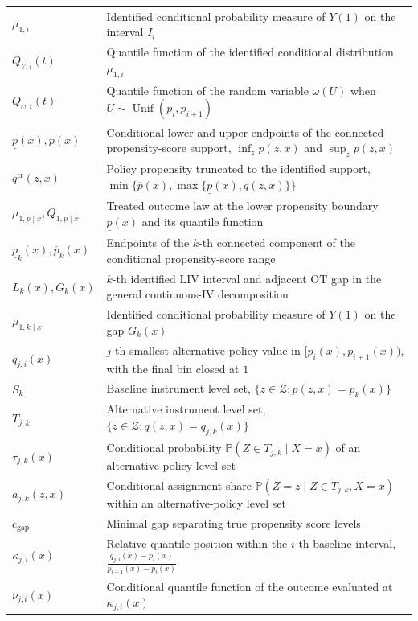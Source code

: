 {\begin{longtable}{lp{\dimexpr\textwidth-5.6cm\relax}}
$\mu_{1,i}$ & Identified conditional probability measure of $Y(1)$ on the interval $I_i$ \\
$Q_{Y,i}(t)$ & Quantile function of the identified conditional distribution $\mu_{1,i}$ \\
$Q_{\omega,i}(t)$ & Quantile function of the random variable $\omega(U)$ when $U \sim \operatorname{Unif}(p_i, p_{i+1})$ \\
$\underline{p}(x), \overline{p}(x)$ & Conditional lower and upper endpoints of the connected propensity-score support, $\inf_z p(z,x)$ and $\sup_z p(z,x)$ \\
$q^{\mathrm{tr}}(z,x)$ & Policy propensity truncated to the identified support, $\min\{\overline{p}(x),\max\{\underline{p}(x),q(z,x)\}\}$ \\
$\mu_{1,\underline{p}\mid x}, Q_{1,\underline{p}\mid x}$ & Treated outcome law at the lower propensity boundary $\underline{p}(x)$ and its quantile function \\
$\underline{p}_k(x), \overline{p}_k(x)$ & Endpoints of the $k$-th connected component of the conditional propensity-score range \\
$L_k(x), G_k(x)$ & $k$-th identified LIV interval and adjacent OT gap in the general continuous-IV decomposition \\
$\mu_{1,k\mid x}$ & Identified conditional probability measure of $Y(1)$ on the gap $G_k(x)$ \\
$q_{j,i}(x)$ & $j$-th smallest alternative-policy value in $[p_i(x),p_{i+1}(x))$, with the final bin closed at $1$ \\
$S_k$ & Baseline instrument level set, $\{z \in \mathcal{Z} : p(z,x) = p_k(x)\}$ \\
$T_{j,k}$ & Alternative instrument level set, $\{z \in \mathcal{Z} : q(z,x) = q_{j,k}(x)\}$ \\
$\tau_{j,k}(x)$ & Conditional probability $\mathbb P(Z\in T_{j,k}\mid X=x)$ of an alternative-policy level set \\
$a_{j,k}(z,x)$ & Conditional assignment share $\mathbb P(Z=z\mid Z\in T_{j,k},X=x)$ within an alternative-policy level set \\
$c_{\text{gap}}$ & Minimal gap separating true propensity score levels \\
$\kappa_{j,i}(x)$ & Relative quantile position within the $i$-th baseline interval, $\frac{q_{j,i}(x)-p_i(x)}{p_{i+1}(x)-p_i(x)}$ \\
$\nu_{j,i}(x)$ & Conditional quantile function of the outcome evaluated at $\kappa_{j,i}(x)$ \\

\end{longtable}}
